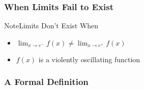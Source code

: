 \documentclass{MathNotes}
\newenvironment{note}[1]{\begin{YellowBox}{Note}{#1}}{\end{YellowBox}}
\begin{document}
\subsubsection{When Limits Fail to Exist}
\begin{note}{Limits Don't Exist When}
	\begin{itemize}
		\item $\lim_{x\to c^-}f(x)\neq \lim_{x\to c^+}f(x)$
		\item $f(x)$ is a violently oscillating function
	\end{itemize}
\end{note}

\newpage
\subsubsection{A Formal Definition}
\end{document}
